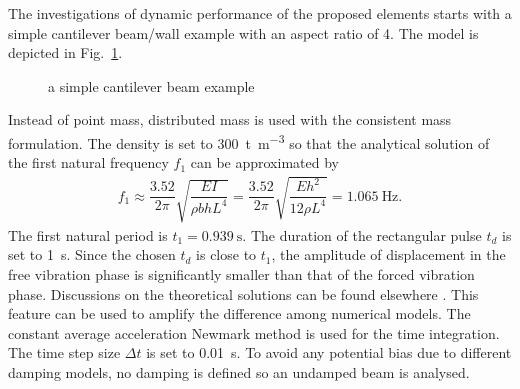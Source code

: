 \documentclass[3p,sort&compress,review,11pt,fleqn]{elsarticle}
\newcommand*{\figref}[1]{Fig.~\ref{#1}}
\begin{document}
The investigations of dynamic performance of the proposed elements starts with a simple cantilever beam/wall example with an aspect ratio of \num{4}. The model is depicted in \figref{fig:cantilever_model}.
\begin{figure}[htb]
\centering\footnotesize
{}
\caption{a simple cantilever beam example}\label{fig:cantilever_model}
\end{figure}
Instead of point mass, distributed mass is used with the consistent mass formulation. The density is set to \SI{300}{\tonne\per\metre^3} so that the analytical solution of the first natural frequency $f_1$ \citep{Young2012} can be approximated by
\begin{gather}
f_1\approx\dfrac{3.52}{2\pi}\sqrt{\dfrac{EI}{\rho{}bhL^4}}=\dfrac{3.52}{2\pi}\sqrt{\dfrac{Eh^2}{12\rho{}L^4}}=\SI{1.065}{\hertz}.
\end{gather}
The first natural period is $t_1=\SI{0.939}{\second}$. The duration of the rectangular pulse $t_d$ is set to \SI{1}{\second}. Since the chosen $t_d$ is close to $t_1$, the amplitude of displacement in the free vibration phase is significantly smaller than that of the forced vibration phase. Discussions on the theoretical solutions can be found elsewhere \citep{Chopra2011}. This feature can be used to amplify the difference among numerical models. The constant average acceleration Newmark method is used for the time integration. The time step size $\Delta{}t$ is set to \SI{0.01}{\second}. To avoid any potential bias due to different damping models, no damping is defined so an undamped beam is analysed.
\end{document}
